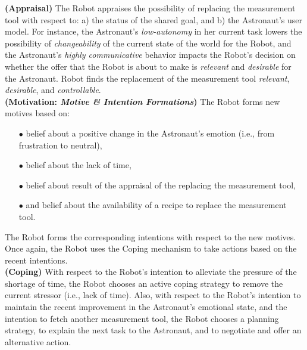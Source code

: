 \noindent\textbf{(Appraisal)} The Robot appraises the possibility of
replacing the measurement tool with respect to: a) the status of the shared
goal, and b) the Astronaut's user model. For instance, the Astronaut's
\textit{low-autonomy} in her current task lowers the possibility of
\textit{changeability} of the current state of the world for the Robot, and the
Astronaut's \textit{highly communicative} behavior impacts the Robot's decision
on whether the offer that the Robot is about to make is \textit{relevant} and
\textit{desirable} for the Astronaut. Robot finds the replacement of the
measurement tool \textit{relevant}, \textit{desirable}, and
\textit{controllable}.\\

\noindent\textbf{(Motivation: \textit{Motive \& Intention Formations})} The
Robot forms new motives based on:

\begin{itemize}
  \item[$\bullet$] belief about a positive change in the Astronaut's emotion
  (i.e., from frustration to neutral),
  \item[$\bullet$] belief about the lack of time,
  \item[$\bullet$] belief about result of the appraisal of the replacing the
  measurement tool,
  \item[$\bullet$] and belief about the availability of a recipe to replace the
  measurement tool.
\end{itemize}

\noindent The Robot forms the corresponding intentions with respect to the new
motives. Once again, the Robot uses the Coping mechanism to take actions
based on the recent intentions.\\

\noindent\textbf{(Coping)} With respect to the Robot's intention to alleviate
the pressure of the shortage of time, the Robot chooses an active coping
strategy to remove the current stressor (i.e., lack of time). Also, with respect
to the Robot's intention to maintain the recent improvement in the Astronaut's
emotional state, and the intention to fetch another measurement tool, the Robot
chooses a planning strategy, to explain the next task to the Astronaut, and to
negotiate and offer an alternative action.\\

\noindent{}\\

